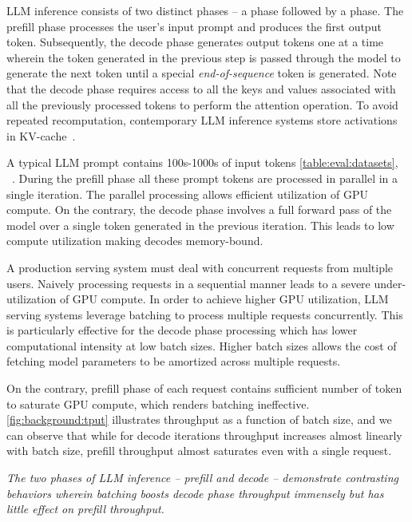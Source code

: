  LLM inference consists of two distinct phases -- a \prefill phase followed by a \decode phase. The prefill phase processes the user's input prompt and produces the first output token. Subsequently, the decode phase generates output tokens one at a time wherein the token generated in the previous step is passed through the model to generate the next token until a special \textit{end-of-sequence} token is generated. Note that the decode phase requires access to all the keys and values associated with all the previously processed tokens to perform the attention operation. To avoid repeated recomputation, contemporary LLM inference systems store activations in KV-cache~\cite{megatron,orca,fastertransformer}.

A typical LLM prompt contains 100s-1000s of input tokens \autoref{table:eval:datasets}, ~\cite{zheng2023lmsyschat1m}. During the prefill phase all these prompt tokens are processed in parallel in a single iteration. The parallel processing allows efficient utilization of GPU compute. On the contrary, the decode phase involves a full forward pass of the model over a single token generated in the previous iteration. This leads to low compute utilization making decodes memory-bound.



 A production serving system must deal with concurrent requests from multiple users. Naively processing requests in a sequential manner leads to a severe under-utilization of GPU compute. In order to achieve higher GPU utilization, LLM serving systems leverage batching to process multiple requests concurrently. This is particularly effective for the decode phase processing which has lower computational intensity at low batch sizes. Higher batch sizes allows the cost of fetching model parameters to be amortized across multiple requests.

\if
On the contrary, prefill phase of each request contains sufficient number of token to saturate GPU compute, which renders batching ineffective. \autoref{fig:background:tput} illustrates throughput as a function of batch size, and we can observe that while for decode iterations throughput increases almost linearly with batch size, prefill throughput almost saturates even with a single request.

 \textit{The two phases of LLM inference -- prefill and decode -- demonstrate contrasting behaviors wherein batching boosts decode phase throughput immensely but has little effect on prefill throughput.}
\fi

